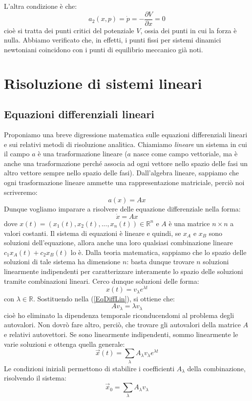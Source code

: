 \documentclass[a4paper,openany]{article}
\begin{document}
	L'altra condizione è che:
	$$
	a_{2}(x,p) = \dot{p} = -\dfrac{\partial V}{\partial x} = 0
	$$
	cioè si tratta dei punti critici del potenziale $V$, ossia dei punti in cui la forza è nulla. Abbiamo verificato che, in effetti, i punti fissi per sistemi dinamici newtoniani coincidono con i punti di equilibrio meccanico già noti.
	\newpage 
	\section{Risoluzione di sistemi lineari}
	\subsection{Equazioni differenziali lineari}
	Proponiamo una breve digressione matematica sulle equazioni differenziali lineari e sui relativi metodi di risoluzione analitica. Chiamiamo \textit{lineare} un sistema in cui il campo $a$ è una trasformazione lineare ($a$ nasce come campo vettoriale, ma è anche una trasformazione perché associa ad ogni vettore nello spazio delle fasi un altro vettore sempre nello spazio delle fasi). Dall'algebra lineare, sappiamo che ogni trasformazione lineare ammette una rappresentazione matriciale, perciò noi scriveremo:
	\begin{equation}
		a(x) = Ax
	\end{equation}
	Dunque vogliamo imparare a risolvere delle equazione differenziale nella forma:
	\begin{equation}
		\dot{x} = Ax
		\label{EqDiffLin}
	\end{equation}
	dove $x(t) = (x_{1}(t), x_{2}(t), ..., x_{n}(t)) \in \mathbb{R}^{n}$ e $A$ è una matrice $n\times n$ a valori costanti. Il sistema di equazioni è lineare e quindi, se $x_{A}$ e $x_{B}$ sono soluzioni dell'equazione, allora anche una loro qualsiasi combinazione lineare $c_{1}x_{A}(t) + c_{2}x_{B}(t)$ lo è. Dalla teoria matematica, sappiamo che lo spazio delle soluzioni di tale sistema ha dimensione $n$: basta dunque trovare $n$ soluzioni linearmente indipendenti per caratterizzare interamente lo spazio delle soluzioni tramite combinazioni lineari. Cerco dunque soluzioni delle forma:
	$$
	x(t) = v_{\lambda}e^{\lambda t}
	$$
	con $\lambda \in \mathbb{R}$. Sostituendo nella (\ref{EqDiffLin}), si ottiene che:
	$$
	Av_{\lambda} = \lambda v_{\lambda}
	$$
	cioè ho eliminato la dipendenza temporale riconducendomi al problema degli autovalori. Non dovrò fare altro, perciò, che trovare gli autovalori della matrice $A$ e relativi autovettori. Se sono linearmente indipendenti, sommo linearmente le varie soluzioni e ottenga quella generale:
	$$
	\vec{x}(t) = \sum_{\lambda}A_{\lambda}v_{\lambda}e^{\lambda t}
	$$
	Le condizioni iniziali permettono di stabilire i coefficienti $A_{\lambda}$ della combinazione, risolvendo il sistema:
	$$
	\vec{x}_{0} = \sum_{\lambda} A_{\lambda}v_{\lambda}
	$$
\end{document}
